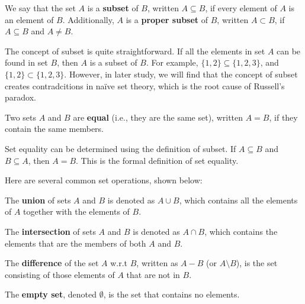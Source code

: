 \begin{definition}[Subset]
We say that the set $A$ is a \textbf{subset} of $B$, written $A \subseteq B$, if every element of $A$ is an element of $B$. Additionally, $A$ is a \textbf{proper subset} of $B$, written $A \subset B$, if $A \subseteq B$ and $A \ne B$.
\end{definition}

The concept of subset is quite straightforward. If all the elements in set $A$ can be found in set $B$, then $A$ is a subset of $B$. For example, $\{1, 2\} \subseteq \{1, 2, 3\}$, and $\{1, 2\} \subset \{1, 2, 3\}$. However, in later study, we will find that the concept of subset creates contradcitions in naïve set theory, which is the root cause of Russell's paradox.

\begin{definition}[Equality]
Two sets $A$ and $B$ are \textbf{equal} (i.e., they are the same set), written $A = B$, if they contain the same members.
\end{definition}

Set equality can be determined using the definition of subset. If $A \subseteq B$ and $B \subseteq A$, then $A = B$. This is the formal definition of set equality.

Here are several common set operations, shown below:

\begin{definition}
The \textbf{union} of sets $A$ and $B$ is denoted as $A \cup B$, which contains all the elements of $A$ together with the elements of $B$.
\end{definition}

\begin{definition}
The \textbf{intersection} of sets $A$ and $B$ is denoted as $A \cap B$, which contains the elements that are the members of both $A$ and $B$.
\end{definition}

\begin{definition}
The \textbf{difference} of the set $A$ w.r.t $B$, written as $A - B$ (or $A \setminus B$), is the set consisting of those elements of $A$ that are not in $B$.
\end{definition}

\begin{definition}
The \textbf{empty set}, denoted $\emptyset$, is the set that contains no elements.
\end{definition}

